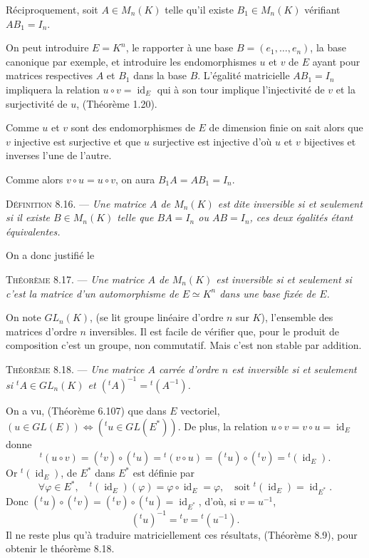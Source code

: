 Réciproquement, soit $A\in M_n(K)$ telle qu'il existe $B_1\in M_n(K)$ vérifiant $AB_1=I_n$.

On peut introduire $E=K^n$, le rapporter à une base $B=(e_1,\ldots,e_n)$, la base canonique par exemple, et introduire les endomorphismes $u$ et $v$ de $E$ ayant pour matrices respectives $A$ et $B_1$ dans la base $B$. L'égalité matricielle $AB_1=I_n$ impliquera la relation $u\circ v=\operatorname{id}_E$ qui à son tour implique l'injectivité de $v$ et la surjectivité de $u$, (Théorème 1.20).

Comme $u$ et $v$ sont des endomorphismes de $E$ de dimension finie on sait alors que $v$ injective est surjective et que $u$ surjective est injective d'où $u$ et $v$ bijectives et inverses l'une de l'autre.

Comme alors $v\circ u=u\circ v$, on aura $B_1A=AB_1=I_n$.

\medskip\noindent\textsc{Définition 8.16.} --- \emph{Une matrice  $A$ de $M_n(K)$ est dite inversible si et seulement si il existe $B\in M_n(K)$ telle que $BA=I_n$ ou $AB=I_n$, ces deux égalités étant équivalentes.}

On a donc justifié le

\medskip\noindent\textsc{Théorème 8.17.} --- \emph{Une matrice  $A$ de $M_n(K)$ est inversible si et seulement si c'est la matrice d'un automorphisme de $E\simeq K^n$ dans une base fixée de $E$.} \bookend

On note $GL_n(K)$, (se lit groupe linéaire d'ordre $n$ sur $K$), l'ensemble des matrices  d'ordre $n$ inversibles. Il est facile de vérifier que, pour le produit de composition c'est un groupe, non commutatif. Mais c'est non stable par addition.

\medskip\noindent\textsc{Théorème 8.18.} --- \emph{Une matrice $A$ carrée d'ordre $n$ est inversible si et seulement si ${}^tA\in GL_n(K)$ et $({}^tA)^{-1}={}^t(A^{-1})$.}

On a vu, (Théorème 6.107) que dans $E$ vectoriel, $(u\in GL(E))\Longleftrightarrow({}^tu\in GL(E^*))$. De plus, la relation $u\circ v=v\circ u=\operatorname{id}_E$ donne
\[
{}^t(u\circ v)=({}^tv)\circ({}^tu)={}^t(v\circ u)=({}^tu)\circ({}^tv)={}^t(\operatorname{id}_E).
\]
Or ${}^t(\operatorname{id}_E)$, de $E^*$ dans $E^*$ est définie par
\[
\forall\varphi\in E^*,\quad {}^t(\operatorname{id}_E)(\varphi)=\varphi\circ\operatorname{id}_E=\varphi,
\quad\text{soit }{}^t(\operatorname{id}_E)=\operatorname{id}_{E^*}.
\]
Donc $({}^tu)\circ({}^tv)=({}^tv)\circ({}^tu)=\operatorname{id}_{E^*}$, d'où, si $v=u^{-1}$,
\[
({}^tu)^{-1}={}^tv={}^t(u^{-1}).
\]
Il ne reste plus qu'à traduire matriciellement ces résultats, (Théorème 8.9), pour obtenir le théorème 8.18.

